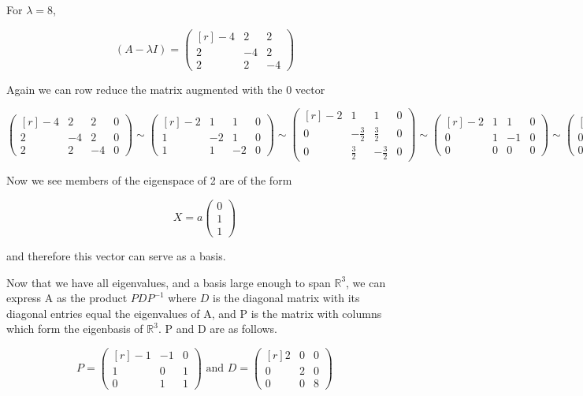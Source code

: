 \documentclass[11pt]{amsart}
\begin{document}
For $\lambda=8$, 

\[
(A-\lambda I)=
\begin{pmatrix*}[r]
-4&2&2\\
2&-4&2\\
2&2&-4
\end{pmatrix*}
\]

Again we can row reduce the matrix augmented with the 0 vector

\[
\begin{pmatrix*}[r]
-4&2&2&0\\
2&-4&2&0\\
2&2&-4&0
\end{pmatrix*}
\sim
\begin{pmatrix*}[r]
-2&1&1&0\\
1&-2&1&0\\
1&1&-2&0
\end{pmatrix*}
\sim
\begin{pmatrix*}[r]
-2&1&1&0\\
0&-\frac{3}{2}&\frac{3}{2}&0\\
0&\frac{3}{2}&-\frac{3}{2}&0
\end{pmatrix*}
\sim
\begin{pmatrix*}[r]
-2&1&1&0\\
0&1&-1&0\\
0&0&0&0
\end{pmatrix*}
\sim
\begin{pmatrix*}[r]
1&0&0&0\\
0&1&-1&0\\
0&0&0&0
\end{pmatrix*}
\]

Now we see members of the eigenspace of 2 are of the form

\[
X=a
\begin{pmatrix*}
0\\
1\\
1
\end{pmatrix*}
\]

and therefore this vector can serve as a basis.

Now that we have all eigenvalues, and a basis large enough to span $\mathbb{R}^3$, we can express A as the product $PDP^{-1}$ where $D$ is the diagonal matrix with its diagonal entries equal the eigenvalues of A, and P is the matrix with columns which form the eigenbasis of $\mathbb{R}^3$. P and D are as follows.

\[
P=
\begin{pmatrix*}[r]
-1&-1&0\\
1&0&1\\
0&1&1
\end{pmatrix*}
\text{ and }
D=
\begin{pmatrix*}[r]
2&0&0\\
0&2&0\\
0&0&8
\end{pmatrix*}
\]
\end{document}
